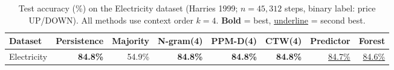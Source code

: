 \begin{table}[h]
\centering
\caption{Test accuracy (\%) on the Electricity dataset (Harries 1999; $n=45,312$ steps, binary label: price UP/DOWN). All methods use context order $k=4$. \textbf{Bold} = best, \underline{underline} = second best.}
\label{tab:electricity_accuracy}
\begin{tabular}{lrrrrrrr}
\toprule
Dataset & Persistence & Majority & N-gram(4) & PPM-D(4) & CTW(4) & Predictor & Forest \\
\midrule
Electricity & \textbf{84.8\%} & 54.9\% & \textbf{84.8\%} & \textbf{84.8\%} & \textbf{84.8\%} & \underline{84.7\%} & \underline{84.6\%} \\
\bottomrule
\end{tabular}
\end{table}
